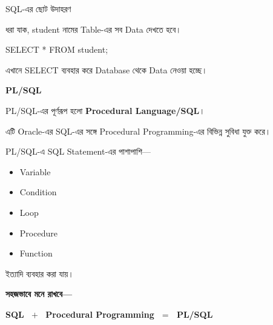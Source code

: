 \begin{examplebox}{SQL-এর ছোট উদাহরণ}

ধরা যাক, \textenglish{\ttfamily student} নামের Table-এর
সব Data দেখতে হবে।

\begin{codebox}

\begin{center}
{\textenglish{\ttfamily SELECT * FROM student;}}
\end{center}

\end{codebox}

এখানে \textenglish{\ttfamily SELECT} ব্যবহার করে Database থেকে
Data নেওয়া হচ্ছে।

\end{examplebox}


\begin{definitionbox}

\textbf{\color{darkTeal}PL/SQL}

PL/SQL-এর পূর্ণরূপ হলো
\textbf{Procedural Language/SQL}।

এটি Oracle-এর SQL-এর সঙ্গে Procedural Programming-এর বিভিন্ন
সুবিধা যুক্ত করে।

\end{definitionbox}

PL/SQL-এ SQL Statement-এর পাশাপাশি—

\begin{itemize}

\item Variable

\item Condition

\item Loop

\item Procedure

\item Function

\end{itemize}

ইত্যাদি ব্যবহার করা যায়।

\textbf{সহজভাবে মনে রাখবে—}

\begin{center}

\textbf{
SQL
\(\;+\;\)
Procedural Programming
\(\;=\;\)
PL/SQL
}

\end{center}

